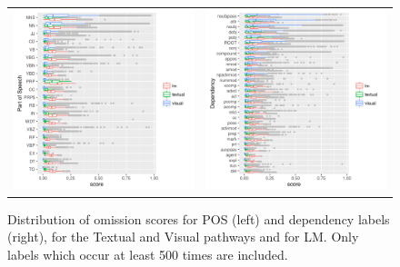 \label{subsec:omission-text-vis}
\begin{figure}[t]
\setlength{\tabcolsep}{0pt}
  \begin{tabular}{cc}
  \includegraphics[scale=0.6]{imaginet-omission-pos-boxplot.png} &
  \includegraphics[scale=0.6]{imaginet-omission-dep-boxplot.png} \\
  \end{tabular}
  
\caption{Distribution of omission scores for POS (left) and dependency labels
  (right), for the {\sc Textual} and {\sc Visual} pathways and for
  {\sc LM}. Only labels which occur at least 500 times are included.}
\label{fig:omission-imaginet}
\end{figure}

